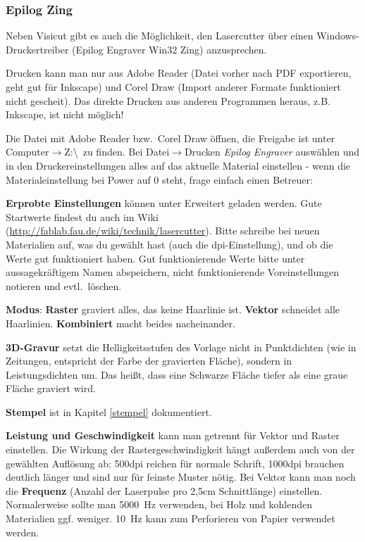 \documentclass{\basedir/fablab-document}
\renewcommand{\todo}[1]{\textbf{\color{red}{TODO: #1}}}
\begin{document}
	\todo{...}

	\subsubsection{Epilog Zing}

	Neben Visicut gibt es auch die Möglichkeit, den Lasercutter über einen Windows-Druckertreiber (Epilog Engraver Win32 Zing) anzusprechen.

	Drucken kann man nur aus Adobe Reader (Datei vorher nach PDF exportieren, geht gut für Inkscape) und Corel Draw (Import anderer Formate funktioniert nicht gescheit).  Das direkte Drucken aus anderen Programmen heraus, z.B. Inkscape, ist nicht möglich!

	Die Datei mit Adobe Reader bzw.\  Corel Draw öffnen, die Freigabe ist unter Computer$\rightarrow$Z:\textbackslash \ zu finden. Bei Datei$\rightarrow$Drucken \textit{Epilog Engraver} auswählen und in den Druckereinstellungen alles auf das aktuelle Material einstellen - wenn die Materialeinstellung bei Power auf 0 steht, frage einfach einen Betreuer:

	\textbf{Erprobte Einstellungen} können unter Erweitert geladen werden. Gute Startwerte findest du auch im Wiki (\url{http://fablab.fau.de/wiki/technik/lasercutter}). Bitte schreibe bei neuen Materialien auf, was du gewählt hast (auch die dpi-Einstellung), und ob die Werte gut funktioniert haben. Gut funktionierende Werte bitte unter aussagekräftigem Namen abspeichern, nicht funktionierende Voreinstellungen notieren und evtl.\  löschen.

	\textbf{Modus}: \textbf{Raster} graviert alles, das keine Haarlinie ist. \textbf{Vektor} schneidet alle Haarlinien. \textbf{Kombiniert} macht beides nacheinander.

	\textbf{3D-Gravur} setzt die Helligkeitsstufen des Vorlage nicht in Punktdichten (wie in Zeitungen, entspricht der Farbe der gravierten Fläche), sondern in Leistungsdichten um. Das heißt, dass eine Schwarze Fläche tiefer als eine graue Fläche graviert wird.

	\textbf{Stempel} ist in Kapitel \ref{stempel} dokumentiert.

	\textbf{Leistung und Geschwindigkeit} kann man getrennt für Vektor und Raster einstellen. Die Wirkung der Rastergeschwindigkeit hängt außerdem auch von der gewählten Auflösung ab: 500dpi reichen für normale Schrift, 1000dpi brauchen deutlich länger und sind nur für feinste Muster nötig. Bei Vektor kann man noch die \textbf{Frequenz} (Anzahl der Laserpulse pro 2,5cm Schnittlänge) einstellen. Normalerweise sollte man 5000~Hz verwenden, bei Holz und kohlenden Materialien ggf. weniger. 10~Hz kann zum Perforieren von Papier verwendet werden. %
\end{document}
